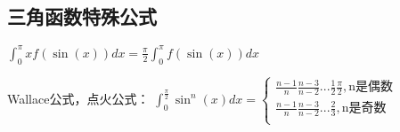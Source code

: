 \subsection{三角函数特殊公式}
$\int ^\pi_0 x f(\sin(x))dx = \frac{\pi}{2}\int ^\pi_0 f(\sin(x))dx$

Wallace公式，点火公式：
$
\int ^{\frac{\pi}{2}}_{0} \sin^n(x) dx= 
\left \{
\begin{aligned}
\frac{n-1}{n} \frac{n-3}{n-2}...\frac{1}{2} \frac{\pi}{2},\text{n是偶数}\\
\frac{n-1}{n} \frac{n-3}{n-2}...\frac{2}{3},\text{n是奇数}\\
\end{aligned}
\right.
$
